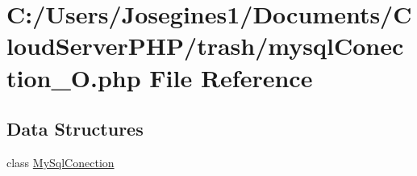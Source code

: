 \hypertarget{mysql_conection___o_8php}{}\section{C\+:/\+Users/\+Josegines1/\+Documents/\+Cloud\+Server\+P\+H\+P/trash/mysql\+Conection\+\_\+O.php File Reference}
\label{mysql_conection___o_8php}
\subsection*{Data Structures}
\begin{DoxyCompactItemize}
\item 
class \mbox{\hyperlink{class_my_sql_conection}{My\+Sql\+Conection}}
\end{DoxyCompactItemize}
